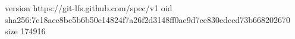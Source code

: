 version https://git-lfs.github.com/spec/v1
oid sha256:7c18aec8be5b6b50e14824f7a26f2d3148ff0ae9d7ce830edccd73b668202670
size 174916
